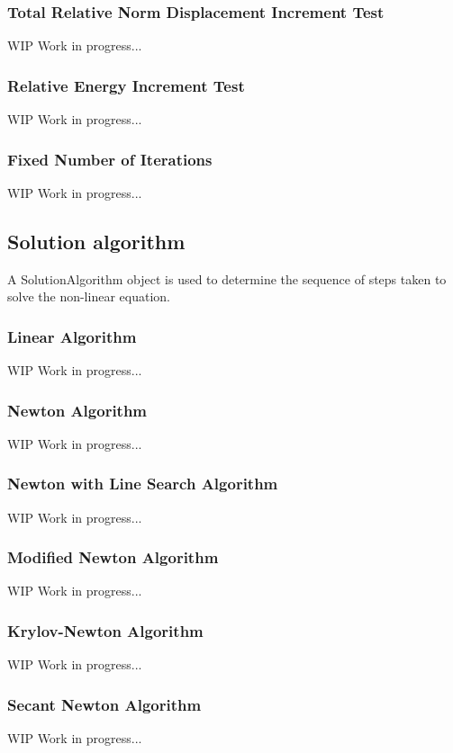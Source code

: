\subsubsection{Total Relative Norm Displacement Increment Test}
WIP Work in progress...

\subsubsection{Relative Energy Increment Test}
WIP Work in progress...

\subsubsection{Fixed Number of Iterations}
WIP Work in progress...
    
\subsection{Solution algorithm}
A SolutionAlgorithm object is used to determine the sequence of steps taken to solve the non-linear equation.

\subsubsection{Linear Algorithm}
WIP Work in progress...

\subsubsection{Newton Algorithm}
WIP Work in progress...

\subsubsection{Newton with Line Search Algorithm}
WIP Work in progress...

\subsubsection{Modified Newton Algorithm}
WIP Work in progress...

\subsubsection{Krylov-Newton Algorithm}
WIP Work in progress...

\subsubsection{Secant Newton Algorithm}
WIP Work in progress...

